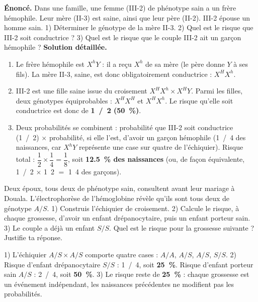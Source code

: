 \documentclass[11pt]{article}
\begin{document}
\begin{exoresolu}
\textbf{Énoncé.} Dans une famille, une femme (III-2) de phénotype sain a un frère hémophile. Leur mère (II-3) est saine, ainsi que leur père (II-2). III-2 épouse un homme sain. 1) Déterminer le génotype de la mère II-3. 2) Quel est le risque que III-2 soit conductrice ? 3) Quel est le risque que le couple III-2 ait un garçon hémophile ?
\tcblower
\textbf{Solution détaillée.}
\begin{enumerate}
\item Le frère hémophile est $X^{h}Y$ : il a reçu $X^{h}$ de sa mère (le père donne $Y$ à ses fils). La mère II-3, saine, est donc obligatoirement conductrice : $X^{H}X^{h}$.
\item III-2 est une fille saine issue du croisement $X^{H}X^{h} \times X^{H}Y$. Parmi les filles, deux génotypes équiprobables : $X^{H}X^{H}$ et $X^{H}X^{h}$. Le risque qu'elle soit conductrice est donc de \textbf{\SI{1}{/2} (\SI{50}{\%})}.
\item Deux probabilités se combinent : probabilité que III-2 soit conductrice (\SI{1}{/2}) $\times$ probabilité, si elle l'est, d'avoir un garçon hémophile (\SI{1}{/4} des naissances, car $X^{h}Y$ représente une case sur quatre de l'échiquier). Risque total : $\dfrac{1}{2} \times \dfrac{1}{4} = \dfrac{1}{8}$, soit \textbf{\SI{12,5}{\%} des naissances} (ou, de façon équivalente, \SI{1}{/2} $\times$ \SI{1}{2} $=$ \SI{1}{4} des garçons).
\end{enumerate}
\end{exoresolu}

\begin{exercice}
Deux époux, tous deux de phénotype sain, consultent avant leur mariage à Douala. L'électrophorèse de l'hémoglobine révèle qu'ils sont tous deux de génotype $A/S$. 1) Construis l'échiquier de croisement. 2) Calcule le risque, à chaque grossesse, d'avoir un enfant drépanocytaire, puis un enfant porteur sain. 3) Le couple a déjà un enfant $S/S$. Quel est le risque pour la grossesse suivante ? Justifie ta réponse.
\end{exercice}

\begin{corrige}
1) L'échiquier $A/S \times A/S$ comporte quatre cases : $A/A$, $A/S$, $A/S$, $S/S$.
2) Risque d'enfant drépanocytaire $S/S$ : \SI{1}{/4}, soit \textbf{\SI{25}{\%}}. Risque d'enfant porteur sain $A/S$ : \SI{2}{/4}, soit \textbf{\SI{50}{\%}}.
3) Le risque reste de \textbf{\SI{25}{\%}} : chaque grossesse est un événement indépendant, les naissances précédentes ne modifient pas les probabilités.
\end{corrige}
\end{document}
